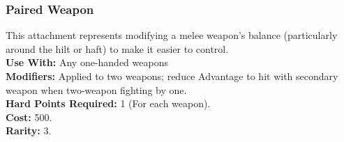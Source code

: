 \subsubsection{Paired Weapon}
This attachment represents modifying a melee weapon’s
balance (particularly around the hilt or haft) to make it
easier to control.\\
\textbf{Use With:} Any one-handed weapons\\
\textbf{Modifiers:} Applied to two weapons; reduce Advantage to hit with secondary weapon when two-weapon fighting by one.\\
\textbf{Hard Points Required:} 1 (For each weapon).\\
\textbf{Cost:} 500.\\
\textbf{Rarity:} 3.\\
